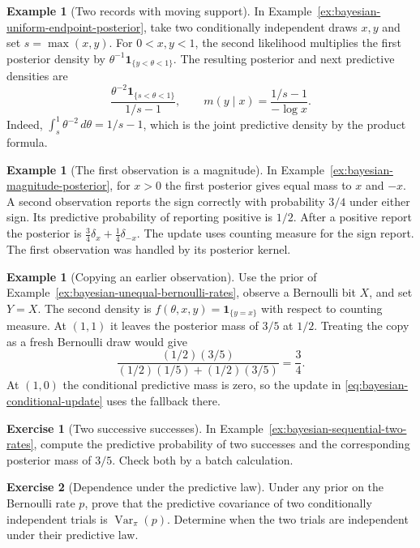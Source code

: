 \documentclass[11pt,oneside]{book}
\theoremstyle{definition}
\newtheorem{example}[theorem]{Example}
\newtheorem{exercise}{Exercise}[section]
\theoremstyle{remark}
\begin{document}
\begin{example}[Two records with moving support]
\label{ex:bayesian-sequential-endpoint}
In Example~\ref{ex:bayesian-uniform-endpoint-posterior}, take two
conditionally independent draws $x,y$ and set $s=\max(x,y)$.
For $0<x,y<1$, the second likelihood multiplies the first posterior
density by $\theta^{-1}\mathbf 1_{\{y<\theta<1\}}$. The resulting
posterior and next predictive densities are
\[
\frac{\theta^{-2}\mathbf 1_{\{s<\theta<1\}}}{1/s-1},
\qquad m(y\mid x)=\frac{1/s-1}{-\log x}.
\]
Indeed, $\int_s^1\theta^{-2}\,d\theta=1/s-1$, which is the joint
predictive density by the product formula.
\end{example}

\begin{example}[The first observation is a magnitude]
\label{ex:bayesian-sequential-noisy-sign}
In Example~\ref{ex:bayesian-magnitude-posterior}, for $x>0$ the first
posterior gives equal mass to $x$ and $-x$. A second observation
reports the sign correctly with probability $3/4$ under either
sign. Its predictive probability of reporting positive is $1/2$.
After a positive report the posterior is
$\tfrac34\delta_x+\tfrac14\delta_{-x}$.
The update uses counting measure for the sign report. The first
observation was handled by its posterior kernel.
\end{example}

\begin{example}[Copying an earlier observation]
\label{ex:bayesian-sequential-copy}
Use the prior of Example~\ref{ex:bayesian-unequal-bernoulli-rates},
observe a Bernoulli bit $X$, and set $Y=X$. The second density is
$f(\theta,x,y)=\mathbf 1_{\{y=x\}}$ with respect to counting
measure. At $(1,1)$ it leaves the posterior mass of $3/5$ at $1/2$.
Treating the copy as a fresh Bernoulli draw would give
\[
\frac{(1/2)(3/5)}{(1/2)(1/5)+(1/2)(3/5)}=\frac34.
\]
At $(1,0)$ the conditional predictive mass is zero, so the update
in \eqref{eq:bayesian-conditional-update} uses the fallback there.
\end{example}

\begin{exercise}[Two successive successes]
\label{exer:bayesian-sequential-successes}
In Example~\ref{ex:bayesian-sequential-two-rates}, compute the
predictive probability of two successes and the corresponding
posterior mass of $3/5$. Check both by a batch calculation.
\end{exercise}

\begin{exercise}[Dependence under the predictive law]
\label{exer:bayesian-sequential-predictive-dependence}
Under any prior on the Bernoulli rate $p$, prove that the predictive
covariance of two conditionally independent trials is
$\operatorname{Var}_\pi(p)$. Determine when the two trials are
independent under their predictive law.
\end{exercise}
\end{document}
